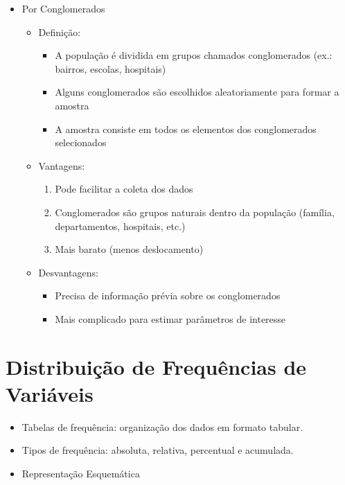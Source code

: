 \documentclass[12pt]{article}
\begin{document}
\begin{itemize}
\begin{itemize}
\begin{enumerate}
            nos estratos
            \item Dentro de cada estrato, podem ser usados diferentes métodos 
            de coleta ou amostragem, conforme necessário
        \end{enumerate}
    \end{itemize}
    \item Por Conglomerados
    \begin{itemize}
        \item Definição: 
        \begin{itemize}
            \item A população é dividida em grupos chamados conglomerados (ex.: 
            bairros, escolas, hospitais)
            \item Alguns conglomerados são escolhidos aleatoriamente para formar 
            a amostra
            \item A amostra consiste em todos os elementos dos conglomerados 
            selecionados
        \end{itemize}
        \item Vantagens:
        \begin{enumerate}
            \item Pode facilitar a coleta dos dados
            \item Conglomerados são grupos naturais dentro da população (família, 
            departamentos, hospitais, etc.)
            \item Mais barato (menos deslocamento)
        \end{enumerate}
        \item Desvantagens:
        \begin{itemize}
            \item Precisa de informação prévia sobre os conglomerados
            \item Mais complicado para estimar parâmetros de interesse
        \end{itemize}
    \end{itemize}
\end{itemize}

\section{Distribuição de Frequências de Variáveis}
\begin{itemize}
    \item Tabelas de frequência: organização dos dados em formato tabular.
    \item Tipos de frequência: absoluta, relativa, percentual e acumulada.
    \item Representação Esquemática
\end{itemize}
\end{document}
